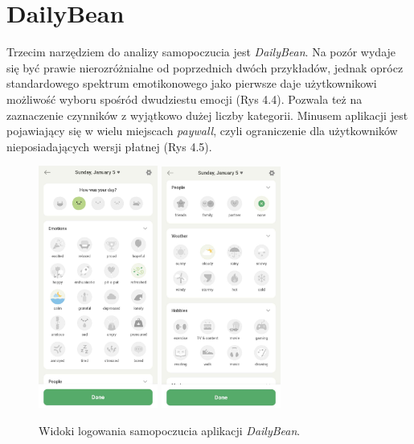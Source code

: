\documentclass[inz, shortabstract]{iithesis}
\begin{document}
\section{DailyBean}
Trzecim narzędziem do analizy samopoczucia jest \textit{DailyBean}. Na pozór wydaje się być prawie nierozróżnialne od poprzednich dwóch przykładów, jednak oprócz standardowego spektrum emotikonowego jako pierwsze daje użytkownikowi możliwość wyboru spośród dwudziestu emocji (Rys 4.4). Pozwala też na zaznaczenie czynników z wyjątkowo dużej liczby kategorii. Minusem aplikacji jest pojawiający się w wielu miejscach \textit{paywall}, czyli ograniczenie dla użytkowników nieposiadających wersji płatnej (Rys 4.5). 

\begin{figure}[!ht]
\centering
\includegraphics[width=0.35\textwidth]{dailybean1.jpg} 
\includegraphics[width=0.35\textwidth]{dailybean2.jpg} 
\caption{Widoki logowania samopoczucia aplikacji \textit{DailyBean}.}
\end{figure}
\end{document}
